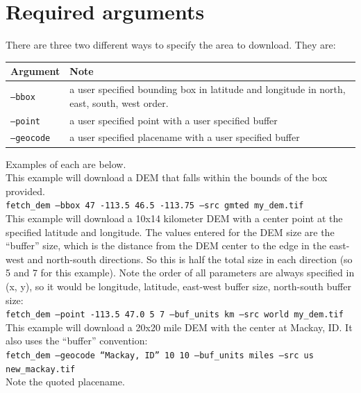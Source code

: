 \documentclass[12pt,oneside,final]{article}
\begin{document}
\section{Required arguments}
There are three two different ways to specify the area to download.  They are:
\medskip
\begin{center}
\begin{tabular}{| l | p{4.0in} |}
    \hline
    Argument & Note \\ \hline
    \texttt{--bbox} & a user specified bounding box in latitude and longitude
                       in north, east, south, west order.\\ \hline
    \texttt{--point} & a user specified point with a user specified buffer \\
                       \hline
    \texttt{--geocode} & a user specified placename with a user specified
                         buffer \\ \hline
\end{tabular}
\end{center}
Examples of each are below.\\

\noindent
This example will download a DEM that falls within the bounds of the box
provided.\\
\texttt{fetch\_dem --bbox 47 -113.5 46.5 -113.75 --src gmted my\_dem.tif}\\

\noindent
This example will download a 10x14 kilometer DEM with a center point at the
specified latitude and longitude.  The values entered for the DEM size are the 
``buffer'' size, which is the distance from the DEM center to the edge in the
east-west and north-south directions.  So this is half the total size in each
direction (so 5 and 7 for this example).  Note the order of all parameters are
always specified in (x, y), so it would be longitude, latitude, east-west buffer
size, north-south buffer size:\\
\texttt{fetch\_dem --point -113.5 47.0 5 7 --buf\_units km --src world my\_dem.tif}\\

\noindent
This example will download a 20x20 mile DEM with the center at Mackay, ID. It also
uses the ``buffer'' convention:\\
\texttt{fetch\_dem --geocode ``Mackay, ID'' 10 10 --buf\_units miles --src us
new\_mackay.tif}\\
Note the quoted placename.\\
\end{document}
